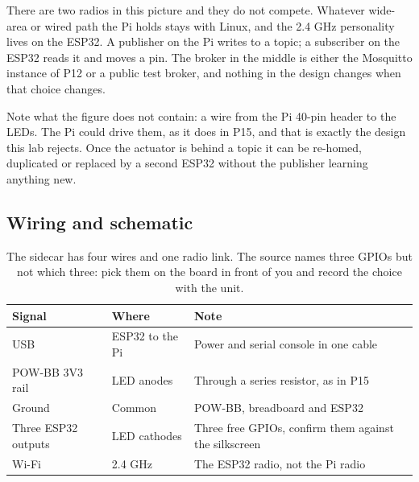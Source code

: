 
There are two radios in this picture and they do not compete. Whatever wide-area or wired path the Pi holds stays with Linux, and the 2.4 GHz personality lives on the ESP32. A publisher on the Pi writes to a topic; a subscriber on the ESP32 reads it and moves a pin. The broker in the middle is either the Mosquitto instance of P12 or a public test broker, and nothing in the design changes when that choice changes.

Note what the figure does not contain: a wire from the Pi 40-pin header to the LEDs. The Pi could drive them, as it does in P15, and that is exactly the design this lab rejects. Once the actuator is behind a topic it can be re-homed, duplicated or replaced by a second ESP32 without the publisher learning anything new.

\subsection*{Wiring and schematic}


\begin{table}[H]\centering\small
\begin{tabular}{p{38mm}p{30mm}p{80mm}}
\toprule
Signal & Where & Note \\
\midrule
USB & ESP32 to the Pi & Power and serial console in one cable \\
POW-BB 3V3 rail & LED anodes & Through a series resistor, as in P15 \\
Ground & Common & POW-BB, breadboard and ESP32 \\
Three ESP32 outputs & LED cathodes & Three free GPIOs, confirm them against the silkscreen \\
Wi-Fi & 2.4 GHz & The ESP32 radio, not the Pi radio \\
\bottomrule
\end{tabular}
\caption{The sidecar has four wires and one radio link. The source names three GPIOs but not which three: pick them on the board in front of you and record the choice with the unit.}
\end{table}

